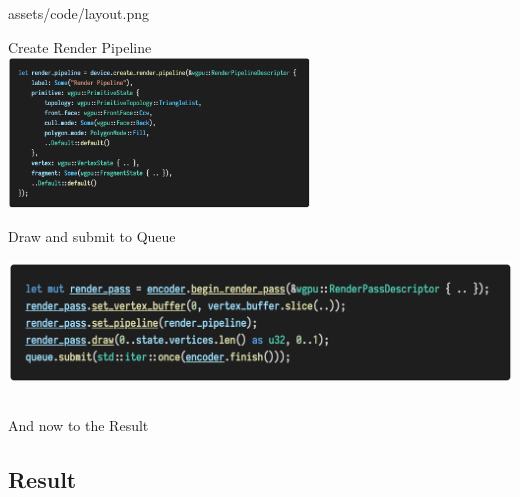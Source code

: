 {{{            assets/code/layout.png
        }
        \item Create Render Pipeline  \\
        \includegraphics[width=\linewidth, height=4cm, keepaspectratio]{
            assets/code/render_pipeline.png
        }
        \item Draw and submit to Queue \\
        \includegraphics[width=0.7\linewidth, height=4cm, keepaspectratio]{
            assets/code/end.png
        }
        \item And now to the Result
    }
}

\subsection{Result}

